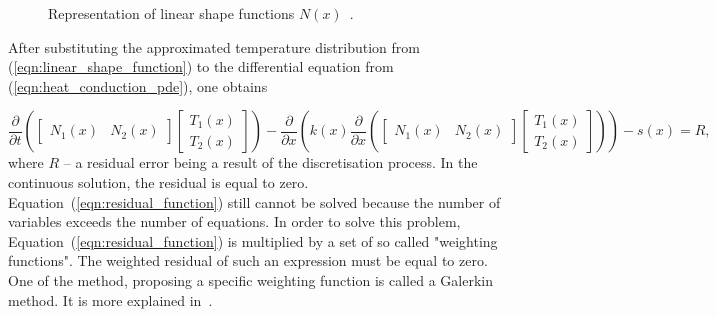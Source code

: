 \begin{figure}[H]
    \centering
    \caption{Representation of linear shape functions $N(x)$~\cite{eth_introduction_to_finite_element}.}
    \label{fig:linear_shape_functions}
\end{figure}

After substituting the approximated temperature distribution from (\ref{eqn:linear_shape_function}) to the differential equation from (\ref{eqn:heat_conduction_pde}), one obtains

\begin{equation}
     \frac{\partial}{\partial t} \left(   
     \begin{bmatrix}  
     N_1(x) & N_2(x)    
    \end{bmatrix} 
    \begin{bmatrix}  
    T_1(x) \\  T_2(x) 
    \end{bmatrix} \right) 
    - \frac{\partial}{\partial x} \left( k(x) \frac{\partial}{\partial x} \left( 
    \begin{bmatrix}  
    N_1(x) & N_2(x)    
    \end{bmatrix} 
    \begin{bmatrix}  
    T_1(x) \\  T_2(x) 
    \end{bmatrix} \right) \right) - s(x) = R,
    \label{eqn:residual_function}
\end{equation}
where $R$ -- a residual error being a result of the discretisation process. In the continuous solution, the residual is equal to zero. Equation~(\ref{eqn:residual_function}) still cannot be solved because the number of variables exceeds the number of equations. In order to solve this problem, Equation~(\ref{eqn:residual_function}) is multiplied by a set of so called "weighting functions". The weighted residual of such an expression must be equal to zero. One of the method, proposing a specific weighting function is called a Galerkin method. It is more explained in~\cite[p.~1-11]{eth_introduction_to_finite_element}.

